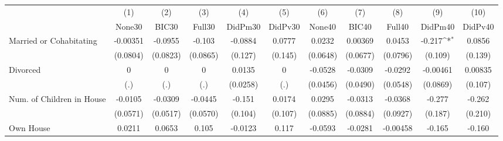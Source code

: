 {
\def\sym#1{\ifmmode^{#1}\else\(^{#1}\)\fi}
\begin{tabular}{l*{10}{c}}
\toprule
            &\multicolumn{1}{c}{(1)}&\multicolumn{1}{c}{(2)}&\multicolumn{1}{c}{(3)}&\multicolumn{1}{c}{(4)}&\multicolumn{1}{c}{(5)}&\multicolumn{1}{c}{(6)}&\multicolumn{1}{c}{(7)}&\multicolumn{1}{c}{(8)}&\multicolumn{1}{c}{(9)}&\multicolumn{1}{c}{(10)}\\
            &\multicolumn{1}{c}{None30}&\multicolumn{1}{c}{BIC30}&\multicolumn{1}{c}{Full30}&\multicolumn{1}{c}{DidPm30}&\multicolumn{1}{c}{DidPv30}&\multicolumn{1}{c}{None40}&\multicolumn{1}{c}{BIC40}&\multicolumn{1}{c}{Full40}&\multicolumn{1}{c}{DidPm40}&\multicolumn{1}{c}{DidPv40}\\
\midrule
Married or Cohabitating&    -0.00351         &     -0.0955         &      -0.103         &     -0.0884         &      0.0777         &      0.0232         &     0.00369         &      0.0453         &      -0.217\sym{*}  &      0.0856         \\
            &    (0.0804)         &    (0.0823)         &    (0.0865)         &     (0.127)         &     (0.145)         &    (0.0648)         &    (0.0677)         &    (0.0796)         &     (0.109)         &     (0.139)         \\
\addlinespace
Divorced    &           0         &           0         &           0         &      0.0135         &           0         &     -0.0528         &     -0.0309         &     -0.0292         &    -0.00461         &     0.00835         \\
            &         (.)         &         (.)         &         (.)         &    (0.0258)         &         (.)         &    (0.0456)         &    (0.0490)         &    (0.0548)         &    (0.0869)         &     (0.107)         \\
\addlinespace
Num. of Children in House&     -0.0105         &     -0.0309         &     -0.0445         &      -0.151         &      0.0174         &      0.0295         &     -0.0313         &     -0.0368         &      -0.277         &      -0.262         \\
            &    (0.0571)         &    (0.0517)         &    (0.0570)         &     (0.104)         &     (0.107)         &    (0.0885)         &    (0.0884)         &    (0.0927)         &     (0.187)         &     (0.210)         \\
\addlinespace
Own House   &      0.0211         &      0.0653         &       0.105         &     -0.0123         &       0.117         &     -0.0593         &     -0.0281         &    -0.00458         &      -0.165         &      -0.160         \\

\end{tabular}}
